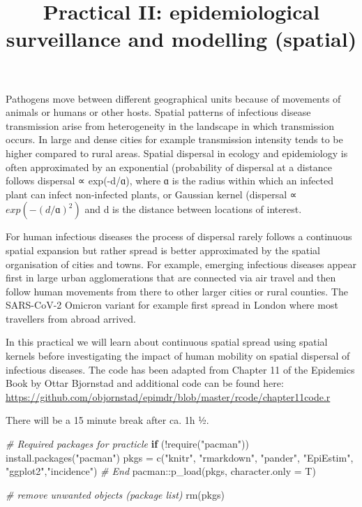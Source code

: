 \documentclass[
  11pt,
]{article}
\title{Practical II: epidemiological surveillance and modelling
(spatial)}
\author{}
\date{\vspace{-2.5em}}
\newenvironment{Shaded}{\begin{snugshade}}{\end{snugshade}}
\newcommand{\AttributeTok}[1]{\textcolor[rgb]{0.77,0.63,0.00}{#1}}
\newcommand{\CommentTok}[1]{\textcolor[rgb]{0.56,0.35,0.01}{\textit{#1}}}
\newcommand{\ControlFlowTok}[1]{\textcolor[rgb]{0.13,0.29,0.53}{\textbf{#1}}}
\newcommand{\FunctionTok}[1]{\textcolor[rgb]{0.00,0.00,0.00}{#1}}
\newcommand{\NormalTok}[1]{#1}
\newcommand{\OtherTok}[1]{\textcolor[rgb]{0.56,0.35,0.01}{#1}}
\newcommand{\SpecialCharTok}[1]{\textcolor[rgb]{0.00,0.00,0.00}{#1}}
\newcommand{\StringTok}[1]{\textcolor[rgb]{0.31,0.60,0.02}{#1}}
\begin{document}
\maketitle

Pathogens move between different geographical units because of movements
of animals or humans or other hosts. Spatial patterns of infectious
disease transmission arise from heterogeneity in the landscape in which
transmission occurs. In large and dense cities for example transmission
intensity tends to be higher compared to rural areas. Spatial dispersal
in ecology and epidemiology is often approximated by an exponential
(probability of dispersal at a distance follows dispersal ∝ exp(-d/ɑ),
where ɑ is the radius within which an infected plant can infect
non-infected plants, or Gaussian kernel (dispersal ∝ \(exp(-(d/ɑ)^2)\)
and d is the distance between locations of interest.

For human infectious diseases the process of dispersal rarely follows a
continuous spatial expansion but rather spread is better approximated by
the spatial organisation of cities and towns. For example, emerging
infectious diseases appear first in large urban agglomerations that are
connected via air travel and then follow human movements from there to
other larger cities or rural counties. The SARS-CoV-2 Omicron variant
for example first spread in London where most travellers from abroad
arrived.

In this practical we will learn about continuous spatial spread using
spatial kernels before investigating the impact of human mobility on
spatial dispersal of infectious diseases. The code has been adapted from
Chapter 11 of the Epidemics Book by Ottar Bjornstad and additional code
can be found here:
\url{https://github.com/objornstad/epimdr/blob/master/rcode/chapter11code.r}

There will be a 15 minute break after ca. 1h ½.

\begin{Shaded}
\begin{Highlighting}[]
\CommentTok{\# Required packages for practicle}
\ControlFlowTok{if}\NormalTok{ (}\SpecialCharTok{!}\FunctionTok{require}\NormalTok{(}\StringTok{"pacman"}\NormalTok{)) }\FunctionTok{install.packages}\NormalTok{(}\StringTok{"pacman"}\NormalTok{)}
\NormalTok{pkgs }\OtherTok{=}
  \FunctionTok{c}\NormalTok{(}\StringTok{"knitr"}\NormalTok{, }\StringTok{"rmarkdown"}\NormalTok{, }\StringTok{"pander"}\NormalTok{, }\StringTok{"EpiEstim"}\NormalTok{,}
    \StringTok{"ggplot2"}\NormalTok{,}\StringTok{"incidence"}\NormalTok{) }\CommentTok{\# End}
\NormalTok{pacman}\SpecialCharTok{::}\FunctionTok{p\_load}\NormalTok{(pkgs, }\AttributeTok{character.only =}\NormalTok{ T)}

\CommentTok{\# remove unwanted objects (package list)}
\FunctionTok{rm}\NormalTok{(pkgs)}
\end{Highlighting}
\end{Shaded}
\end{document}
